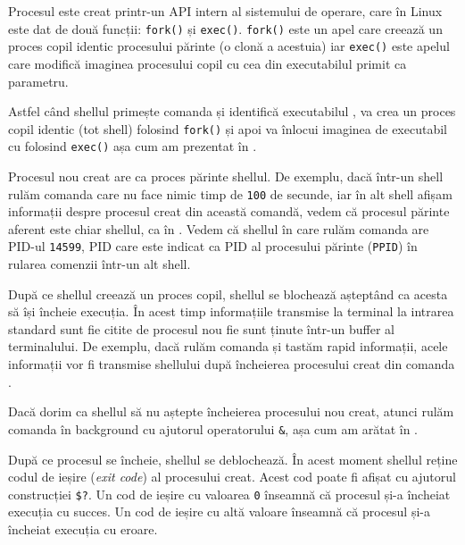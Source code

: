 Procesul este creat printr-un API intern al sistemului de operare, care în Linux este dat de două funcții: \texttt{fork()} și \texttt{exec()}.
\texttt{fork()} este un apel care creează un proces copil identic procesului părinte (o clonă a acestuia) iar \texttt{exec()} este apelul care modifică imaginea procesului copil cu cea din executabilul primit ca parametru.

Astfel când shellul primește comanda  și identifică executabilul , va crea un proces copil identic (tot shell) folosind \texttt{fork()} și apoi va înlocui imaginea de executabil cu  folosind \texttt{exec()} așa cum am prezentat în .

Procesul nou creat are ca proces părinte shellul.
De exemplu, dacă într-un shell rulăm comanda  care nu face nimic timp de \texttt{100} de secunde, iar în alt shell afișam informații despre procesul creat din această comandă, vedem că procesul părinte aferent este chiar shellul, ca în .
Vedem că shellul în care rulăm comanda  are PID-ul \texttt{14599}, PID care este indicat ca PID al procesului părinte (\texttt{PPID}) în rularea comenzii  într-un alt shell.


După ce shellul creează un proces copil, shellul se blochează așteptând ca acesta să își încheie execuția.
În acest timp informațiile transmise la terminal la intrarea standard sunt fie citite de procesul nou fie sunt ținute într-un buffer al terminalului.
De exemplu, dacă rulăm comanda  și tastăm rapid informații, acele informații vor fi transmise shellului după încheierea procesului creat din comanda .

Dacă dorim ca shellul să nu aștepte încheierea procesului nou creat, atunci rulăm comanda în background cu ajutorul operatorului \texttt{\&}, așa cum am arătat în .

După ce procesul se încheie, shellul se deblochează.
În acest moment shellul reține codul de ieșire (\textit{exit code}) al procesului creat.
Acest cod poate fi afișat cu ajutorul construcției \texttt{\$?}.
Un cod de ieșire cu valoarea \texttt{0} înseamnă că procesul și-a încheiat execuția cu succes.
Un cod de ieșire cu altă valoare înseamnă că procesul și-a încheiat execuția cu eroare.

